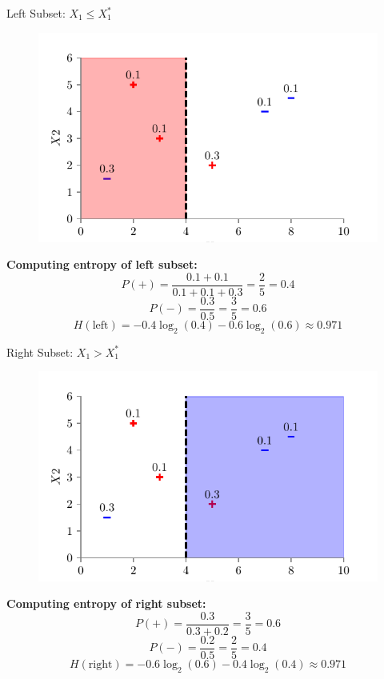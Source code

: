 \documentclass[usenames,dvipsnames]{beamer}
\begin{document}
\begin{frame}{Left Subset: $X_1 \leq X_1^*$}
\begin{figure}
    \centering
    \includegraphics[scale=0.7]{../assets/decision-trees/figures/dt_weighted/fig4.pdf}
\end{figure}
\textbf{Computing entropy of left subset:}
$$P(+) = \frac{0.1 + 0.1}{0.1 + 0.1 + 0.3} = \frac{2}{5} = 0.4$$
$$P(-) = \frac{0.3}{0.5} = \frac{3}{5} = 0.6$$
$$H(\text{left}) = -0.4 \log_2(0.4) - 0.6 \log_2(0.6) \approx 0.971$$
\end{frame}
	
\begin{frame}{Right Subset: $X_1 > X_1^*$}
\begin{figure}
    \centering
    \includegraphics[scale=0.7]{../assets/decision-trees/figures/dt_weighted/fig5.pdf}
\end{figure}
\textbf{Computing entropy of right subset:}
$$P(+) = \frac{0.3}{0.3 + 0.2} = \frac{3}{5} = 0.6$$
$$P(-) = \frac{0.2}{0.5} = \frac{2}{5} = 0.4$$
$$H(\text{right}) = -0.6 \log_2(0.6) - 0.4 \log_2(0.4) \approx 0.971$$
\end{frame}
	
\end{document}
